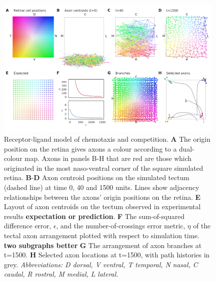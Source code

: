 \documentclass[11pt, a4paper]{article}
\begin{document}
\begin{figure}
\includegraphics[width=\linewidth]{./images/j4_ee_GJ_best_1_wt_fig2_exit_true_steps_1500.png}
\caption{Receptor-ligand model of chemotaxis and competition.
\textbf{A} The origin position on the retina gives axons a colour according to a dual-colour map. Axons in panels B-H that are red are those which originated in the most naso-ventral corner of the square simulated retina.
\textbf{B}-\textbf{D} Axon centroid positions on the simulated tectum (dashed line) at time 0, 40 and 1500 units. Lines show adjacency relationships between the axons' origin positions on the retina.
\textbf{E} Layout of axon centroids on the tectum observed in experimental results \textbf{expectation or prediction}.
\textbf{F} The sum-of-squared difference error, $\epsilon$, and the number-of-crossings error metric, $\eta$ of the tectal axon arrangement plotted with respect to simulation time. \textbf{two subgraphs better}
\textbf{G} The arrangement of axon branches at t=1500.
\textbf{H} Selected axon locations at t=1500, with path histories in grey.
\emph{Abbreviations: D dorsal, V ventral, T temporal, N nasal, C caudal, R rostral, M medial, L lateral.}}
\label{f:GJ}
\end{figure}
\end{document}
